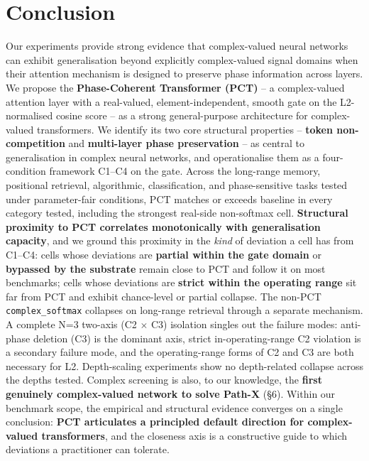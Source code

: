 \documentclass[11pt,a4paper]{article}
\theoremstyle{plain}
\theoremstyle{definition}
\begin{document}
\section{Conclusion}
Our experiments provide strong evidence that complex-valued neural networks can exhibit generalisation beyond explicitly complex-valued signal domains when their attention mechanism is designed to preserve phase information across layers. We propose the \textbf{Phase-Coherent Transformer (PCT)} -- a complex-valued attention layer with a real-valued, element-independent, smooth gate on the L2-normalised cosine score -- as a strong general-purpose architecture for complex-valued transformers. We identify its two core structural properties -- \textbf{token non-competition} and \textbf{multi-layer phase preservation} -- as central to generalisation in complex neural networks, and operationalise them as a four-condition framework C1--C4 on the gate. Across the long-range memory, positional retrieval, algorithmic, classification, and phase-sensitive tasks tested under parameter-fair conditions, PCT matches or exceeds baseline in every category tested, including the strongest real-side non-softmax cell. \textbf{Structural proximity to PCT correlates monotonically with generalisation capacity}, and we ground this proximity in the \emph{kind} of deviation a cell has from C1--C4: cells whose deviations are \textbf{partial within the gate domain} or \textbf{bypassed by the substrate} remain close to PCT and follow it on most benchmarks; cells whose deviations are \textbf{strict within the operating range} sit far from PCT and exhibit chance-level or partial collapse. The non-PCT \texttt{complex\_softmax} collapses on long-range retrieval through a separate mechanism. A complete N=3 two-axis (C2 $\times$ C3) isolation singles out the failure modes: anti-phase deletion (C3) is the dominant axis, strict in-operating-range C2 violation is a secondary failure mode, and the operating-range forms of C2 and C3 are both necessary for L2. Depth-scaling experiments show no depth-related collapse across the depths tested. Complex screening is also, to our knowledge, the \textbf{first genuinely complex-valued network to solve Path-X} (\S{}6). Within our benchmark scope, the empirical and structural evidence converges on a single conclusion: \textbf{PCT articulates a principled default direction for complex-valued transformers}, and the closeness axis is a constructive guide to which deviations a practitioner can tolerate.

\medskip
\end{document}
